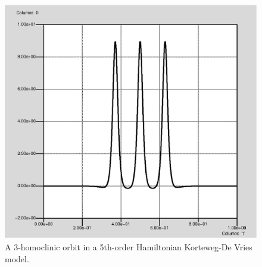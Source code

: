\documentclass[12pt]{report}
\begin{document}
\begin{figure}[htb]
\begin{center}
\includegraphics[scale=0.5]{include/kdv3hom}
\caption{A 3-homoclinic orbit in a 5th-order Hamiltonian 
Korteweg-De Vries model.}
\label{kdv3hom}
\end{center}
\end{figure}



 \label{sec:bibliography}
\end{document}
